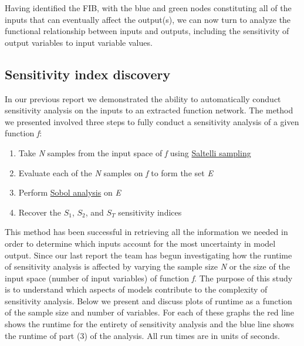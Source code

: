 \documentclass[article, 12pt, oneside]{memoir}
\begin{document}
Having identified the FIB, with the blue and green nodes constituting
all of the inputs that can eventually affect the output(s), we can now
turn to analyze the functional relationship between inputs and outputs,
including the sensitivity of output variables to input variable values.

\hypertarget{sensitivity-index-discovery}{%
\subsection{Sensitivity index
discovery}\label{sensitivity-index-discovery}}

In our previous report we demonstrated the ability to automatically
conduct sensitivity analysis on the inputs to an extracted function
network. The method we presented involved three steps to fully conduct a
sensitivity analysis of a given function \emph{f}:

\begin{enumerate}
\def\labelenumi{\arabic{enumi}.}
\tightlist
\item
  Take \emph{N} samples from the input space of \emph{f} using
  \href{https://en.wikipedia.org/wiki/Variance-based_sensitivity_analysis}{Saltelli
  sampling}
\item
  Evaluate each of the \emph{N} samples on \emph{f} to form the set
  \emph{E}
\item
  Perform
  \href{https://en.wikipedia.org/wiki/Variance-based_sensitivity_analysis}{Sobol
  analysis} on \emph{E}
\item
  Recover the \(S_1\), \(S_2\), and \(S_T\) sensitivity indices
\end{enumerate}

This method has been successful in retrieving all the information we
needed in order to determine which inputs account for the most
uncertainty in model output. Since our last report the team has begun
investigating how the runtime of sensitivity analysis is affected by
varying the sample size \emph{N} or the size of the input space (number
of input variables) of function \emph{f}. The purpose of this study is
to understand which aspects of models contribute to the complexity of
sensitivity analysis. Below we present and discuss plots of runtime as a
function of the sample size and number of variables. For each of these
graphs the red line shows the runtime for the entirety of sensitivity
analysis and the blue line shows the runtime of part (3) of the
analysis. All run times are in units of seconds.
\end{document}
